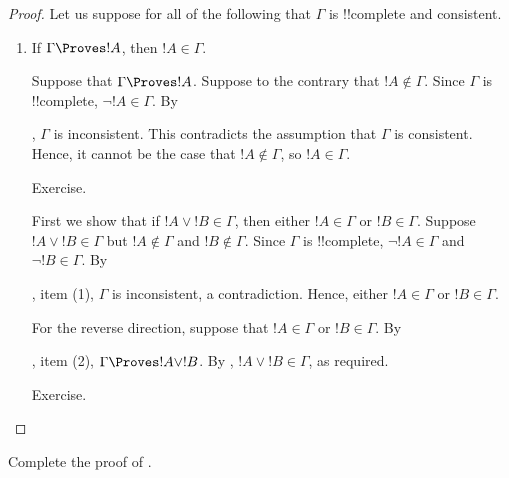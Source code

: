 \begin{proof}
Let us suppose for all of the following that $\Gamma$ is !!{complete} and
consistent.
\begin{enumerate}
\item If $\Gamma \Proves !A$, then $!A \in \Gamma$.

Suppose that $\Gamma \Proves !A$. Suppose to the contrary that $!A
\notin \Gamma$. Since $\Gamma$ is !!{complete}, $\lnot !A \in \Gamma$.
By

  ,
$\Gamma$ is inconsistent. This contradicts the assumption that
$\Gamma$ is consistent. Hence, it cannot be the case that $!A \notin
\Gamma$, so $!A \in \Gamma$.


Exercise.



First we show that if $!A \lor !B \in \Gamma$, then either $!A \in
\Gamma$ or $!B \in \Gamma$. Suppose $!A \lor !B \in \Gamma$ but $!A
\notin \Gamma$ and $!B \notin \Gamma$.  Since $\Gamma$ is
!!{complete}, $\lnot !A \in \Gamma$ and $\lnot !B \in \Gamma$. By

  ,
item (1), $\Gamma$ is inconsistent, a contradiction. Hence, either $!A
\in \Gamma$ or $!B \in \Gamma$.

For the reverse direction, suppose that $!A \in \Gamma$ or $!B \in
\Gamma$. By

  , item (2),
$\Gamma \Proves !A \lor !B$. By , $!A \lor
!B \in \Gamma$, as required.


Exercise.
\end{enumerate}
\end{proof}


\begin{prob}
Complete the proof of .
\end{prob}







  

